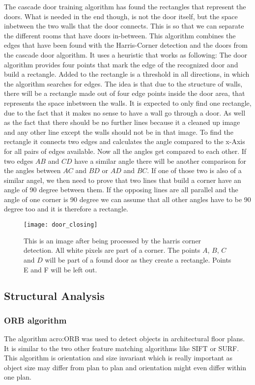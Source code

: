 The cascade door training algorithm has found the rectangles that represent the doors. What is needed in the end though, is not the door itself, but the space inbetween the two walls that the door connects. This is so that we can separate the different rooms that have doors in-between.
This algorithm combines the edges that have been found with the Harris-Corner detection and the doors from the cascade door algorithm. It uses a heuristic that works as following: The door algorithm provides four points that mark the edge of the recognized door and build a rectangle.
Added to the rectangle is  a threshold in all directions, in which the algorithm searches for edges. The idea is that due to the structure of walls, there will be a rectangle made out of four edge points inside the door area, that represents the space inbetween the walls. It is expected to only find one rectangle, due to the fact that it makes no sense to have a wall go through a door. As well as the fact that there should be no further lines because it a cleaned up image and any other line except the walls should not be in that image.
To find the rectangle it connects two edges and calculates the angle compared to the x-Axis for all pairs of edges available. Now all the angles get compared to each other. If two edges $AB$ and $CD$ have a similar angle there will be another comparison for the angles between $AC$ and $BD$ or $AD$ and $BC$. If one of those two is also of a similar angel, we then need to prove that two lines that build a corner have an angle of 90 degree between them. If the opposing lines are all parallel and the angle of one corner is 90 degree we can assume that all other angles have to be 90 degree too and it is therefore a rectangle. 

\begin{figure}[H]
	\centering
	\texttt{[image: door\_closing]}
	\caption{This is an image after being processed by the harris corner detection. All white pixels are part of a corner. The points $A$, $B$, $C$ and $D$ will be part of a found door as they create a rectangle. Points E and F will be left out.}
	\label{fig:door_closing}
\end{figure}


\subsection{Structural Analysis}

\subsubsection{ORB algorithm}
\label{sub:ORBAlgorithm}
The algorithm \acrfull{acro:ORB} was used to detect objects in architectural floor plans. It is similar to the two other feature matching algorithms like SIFT or SURF. This algorithm is orientation and size invariant which is really important as object size may differ from plan to plan and orientation might even differ within one plan.

